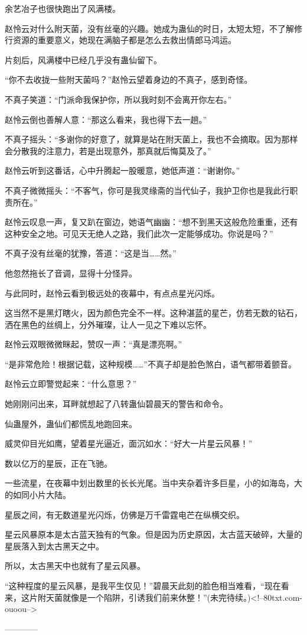 \begin{this_body}
余艺冶子也很快跑出了风满楼。

赵怜云对什么附天菌，没有丝毫的兴趣。她成为蛊仙的时日，太短太短，不了解修行资源的重要意义，她现在满脑子都是怎么去救出情郎马鸿运。

片刻后，风满楼中已经几乎没有蛊仙留下。

“你不去收拢一些附天菌吗？”赵怜云望着身边的不真子，感到奇怪。

不真子笑道：“门派命我保护你，所以我时刻不会离开你左右。”

赵怜云倒也善解人意：“那这么看来，我也得下去一趟。”

不真子摇头：“多谢你的好意了，就算是站在附天菌上，我也不会摘取。因为那样会分散我的注意力，若是出现意外，那真就后悔莫及了。”

赵怜云听到这番话，心中升腾起一股暖意，她低声道：“谢谢你。”

不真子微微摇头：“不客气，你可是我灵缘斋的当代仙子，我护卫你也是我此行职责所在。”

赵怜云叹息一声，复又趴在窗边，她语气幽幽：“想不到黑天这般危险重重，还有这种安全之地。可见天无绝人之路，我们此次一定能够成功。你说是吗？”

不真子没有丝毫的犹豫，答道：“这是当……然。”

他忽然拖长了音调，显得十分怪异。

与此同时，赵怜云看到极远处的夜幕中，有点点星光闪烁。

这当然不是黑灯瞎火，因为颜色完全不一样。这种湛蓝的星芒，仿若无数的钻石，洒在黑色的丝绸上，分外璀璨，让人一见之下难以忘怀。

赵怜云双眼微微眯起，赞叹一声：“真是漂亮啊。”

“是非常危险！根据记载，这种规模……”不真子却是脸色煞白，语气都带着颤音。

赵怜云立即警觉起来：“什么意思？”

她刚刚问出来，耳畔就想起了八转蛊仙碧晨天的警告和命令。

仙蛊屋外，蛊仙们都慌乱地跑回来。

威灵仰目光如鹰，望着星光逼近，面沉如水：“好大一片星云风暴！”

数以亿万的星辰，正在飞驰。

一些流星，在夜幕中划出数里的长长光尾。当中夹杂着许多巨星，小的如海岛，大的如同小片大陆。

星辰之间，有无数道星光闪烁，仿佛是万千雷霆电芒在纵横交织。

星云风暴原本是太古蓝天独有的气象。但是因为历史原因，太古蓝天破碎，大量的星辰落入到太古黑天之中。

所以，太古黑天中也就有了星云风暴。

“这种程度的星云风暴，是我平生仅见！”碧晨天此刻的脸色相当难看，“现在看来，这片附天菌就像是一个陷阱，引诱我们前来休整！”(未完待续。)<!--80txt.com-ouoou-->

------------

\end{this_body}

